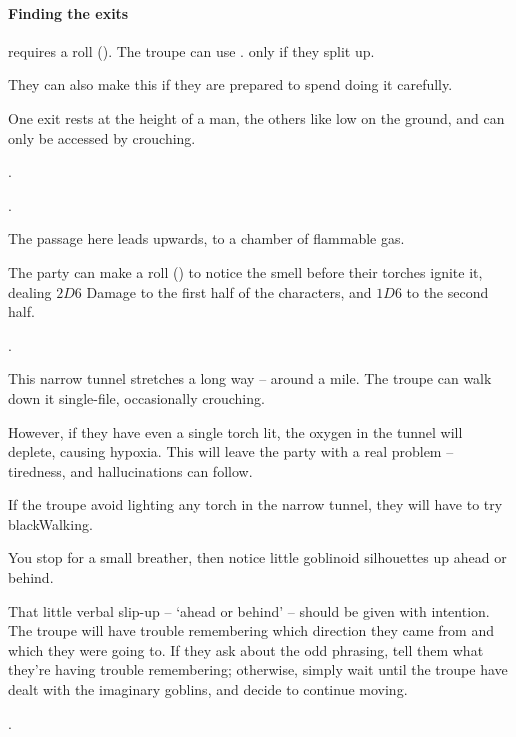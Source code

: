\begin{multicols}{2}
\paragraph{Finding the exits}
requires a  roll (\tn[9]).
The troupe can use .%
only if they split up.

They can also make this  if they are prepared to spend  doing it carefully.

One exit rests at the height of a man, the others like low on the ground, and can only be accessed by crouching.

.

.


The passage here leads upwards, to a chamber of flammable gas.

The party can make a  roll (\tn[13]) to notice the smell before their torches ignite it, dealing $2D6$ Damage to the first half of the characters, and $1D6$ to the second half.

.


This narrow tunnel stretches a long way -- around a mile.
The troupe can walk down it single-file, occasionally crouching.

However, if they have even a single torch lit, the oxygen in the tunnel will deplete, causing \gls{hypoxia}.
This will leave the party with a real problem -- tiredness, and hallucinations can follow.

If the troupe avoid lighting any torch in the narrow tunnel, they will have to try \gls{blackWalking}.

\begin{boxtext}
  You stop for a small breather, then notice little goblinoid silhouettes up ahead or behind.
\end{boxtext}

That little verbal slip-up -- `ahead or behind' -- should be given with intention.
The troupe will have trouble remembering which direction they came from and which they were going to.
If they ask about the odd phrasing, tell them what they're having trouble remembering; otherwise, simply wait until the troupe have dealt with the imaginary goblins, and decide to continue moving.

.



\end{multicols}
